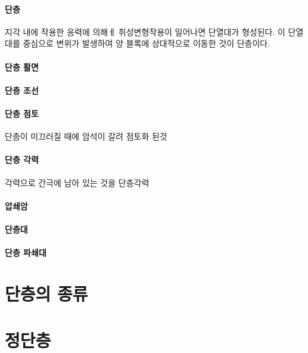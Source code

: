 \documentclass[12pt, a4paper, oneside]{book}
\begin{document}
		\paragraph{단층}
		지각 내에 작용한 응력에 의해ㅔ 취성변형작용이  일어나면 단열대가 형성된다.
		이 단열대를 중심으로 변위가 발생하여 양 블록에 상대적으로 이동한 것이 단층이다.
	
		\paragraph{단층 활면}
	
	
		\paragraph{단층 조선}
	
	
		\paragraph{단층 점토}
		단층이 미끄러질 때에 암석이 갈려 점토화 된것
			
	
		\paragraph{단층 각력}
		각력으로 간극에 남아 있는 것을 단층각력
		
		\paragraph{압쇄암}
		
	
		\paragraph{단층대}

		\paragraph{단층 파쇄대}




	\clearpage
	\section{단층의 종류}




	\clearpage
	\section{정단층}
	
\end{document}
